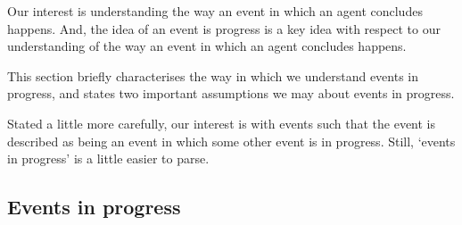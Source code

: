 \begin{note}
  Our interest is understanding the way an event in which an agent concludes happens.
  And, the idea of an event is progress is a key idea with respect to our understanding of the way an event in which an agent concludes happens.

  This section briefly characterises the way in which we understand events in progress, and states two important assumptions we may about events in progress.

  Stated a little more carefully, our interest is with events such that the event is described as being an event in which some other event is in progress.
  Still, `events in progress' is a little easier to parse.
\end{note}



\subsection{Events in progress}


